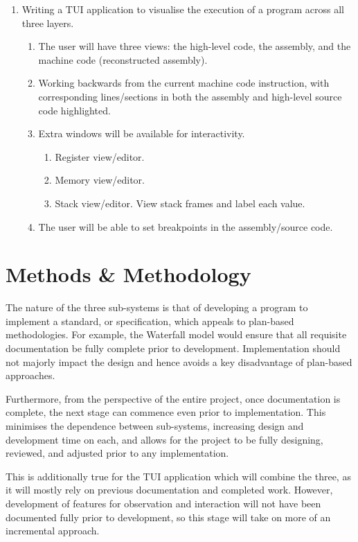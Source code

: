 \documentclass{article}
\begin{document}
\begin{enumerate}
        \item Writing a TUI application to visualise the execution of a program across all three layers.
        \begin{enumerate}
            \item The user will have three views: the high-level code, the assembly, and the machine code (reconstructed assembly).
            \item Working backwards from the current machine code instruction, with corresponding lines/sections in both the assembly and high-level source code highlighted.
            \item Extra windows will be available for interactivity.
            \begin{enumerate}
                \item Register view/editor.
                \item Memory view/editor.
                \item Stack view/editor.
                View stack frames and label each value.
            \end{enumerate}
            \item The user will be able to set breakpoints in the assembly/source code.
        \end{enumerate}
    \end{enumerate}

    \section{Methods \& Methodology}\label{sec:methods-&-methodology}

    The nature of the three sub-systems is that of developing a program to implement a standard, or specification, which appeals to plan-based methodologies.
    For example, the Waterfall model would ensure that all requisite documentation be fully complete prior to development.
    Implementation should not majorly impact the design and hence avoids a key disadvantage of plan-based approaches.

    Furthermore, from the perspective of the entire project, once documentation is complete, the next stage can commence even prior to implementation.
    This minimises the dependence between sub-systems, increasing design and development time on each, and allows for the project to be fully designing, reviewed, and adjusted prior to any implementation.

    This is additionally true for the TUI application which will combine the three, as it will mostly rely on previous documentation and completed work.
    However, development of features for observation and interaction will not have been documented fully prior to development, so this stage will take on more of an incremental approach.
\end{document}
